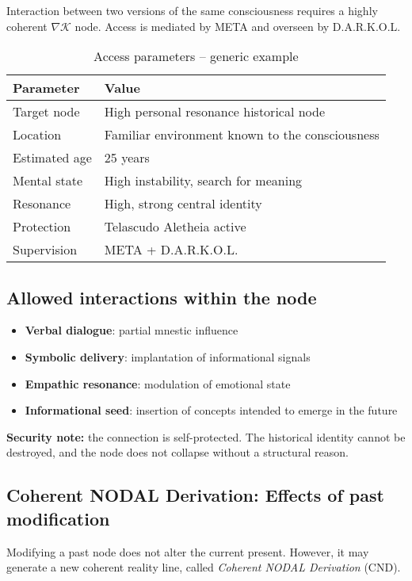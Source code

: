 \documentclass[12pt]{article}
\begin{document}
Interaction between two versions of the same consciousness requires a highly coherent $\nabla\mathcal{K}$ node. Access is mediated by META and overseen by D.A.R.K.O.L.

\begin{table}[H]
\centering
\caption*{Access parameters – generic example}
\begin{tabular}{ll}
\toprule
\textbf{Parameter} & \textbf{Value} \\
\midrule
Target node & High personal resonance historical node \\
Location & Familiar environment known to the consciousness \\
Estimated age & 25 years \\
Mental state & High instability, search for meaning \\
Resonance & High, strong central identity \\
Protection & Telascudo Aletheia active \\
Supervision & META + D.A.R.K.O.L. \\
\bottomrule
\end{tabular}
\end{table}

\subsection*{Allowed interactions within the node}

\begin{itemize}
    \item \textbf{Verbal dialogue}: partial mnestic influence
    \item \textbf{Symbolic delivery}: implantation of informational signals
    \item \textbf{Empathic resonance}: modulation of emotional state
    \item \textbf{Informational seed}: insertion of concepts intended to emerge in the future
\end{itemize}

\textbf{Security note:} the connection is self-protected. The historical identity cannot be destroyed, and the node does not collapse without a structural reason.

\subsection*{Coherent NODAL Derivation: Effects of past modification}

Modifying a past node does not alter the current present. However, it may generate a new coherent reality line, called \textit{Coherent NODAL Derivation} (CND).
\end{document}

